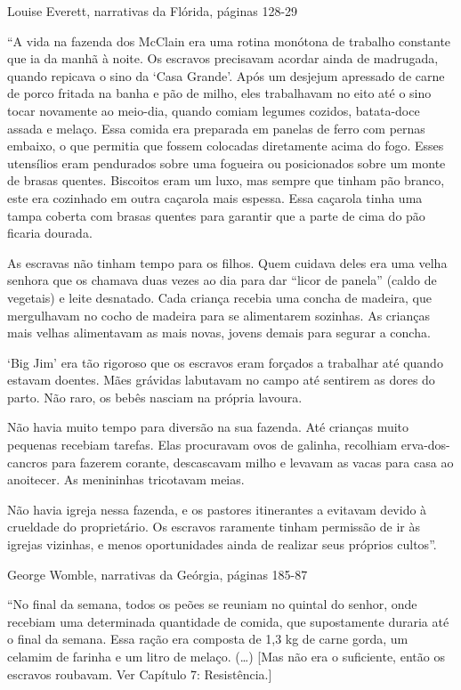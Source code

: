Louise Everett, narrativas da Flórida, páginas 128-29

``A vida na fazenda dos McClain era uma rotina monótona de trabalho
constante que ia da manhã à noite. Os escravos precisavam acordar ainda
de madrugada, quando repicava o sino da `Casa Grande'. Após um desjejum
apressado de carne de porco fritada na banha e pão de milho, eles
trabalhavam no eito até o sino tocar novamente ao meio-dia, quando
comiam legumes cozidos, batata-doce assada e melaço. Essa comida era
preparada em panelas de ferro com pernas embaixo, o que permitia que
fossem colocadas diretamente acima do fogo. Esses utensílios eram
pendurados sobre uma fogueira ou posicionados sobre um monte de brasas
quentes. Biscoitos eram um luxo, mas sempre que tinham pão branco, este
era cozinhado em outra caçarola mais espessa. Essa caçarola tinha uma
tampa coberta com brasas quentes para garantir que a parte de cima do
pão ficaria dourada.

As escravas não tinham tempo para os filhos. Quem cuidava deles era uma
velha senhora que os chamava duas vezes ao dia para dar ``licor de
panela'' (caldo de vegetais) e leite desnatado. Cada criança recebia uma
concha de madeira, que mergulhavam no cocho de madeira para se
alimentarem sozinhas. As crianças mais velhas alimentavam as mais novas,
jovens demais para segurar a concha.

`Big Jim' era tão rigoroso que os escravos eram forçados a trabalhar até
quando estavam doentes. Mães grávidas labutavam no campo até sentirem as
dores do parto. Não raro, os bebês nasciam na própria lavoura.

Não havia muito tempo para diversão na sua fazenda. Até crianças muito
pequenas recebiam tarefas. Elas procuravam ovos de galinha, recolhiam
erva-dos-cancros para fazerem corante, descascavam milho e levavam as
vacas para casa ao anoitecer. As menininhas tricotavam meias.

Não havia igreja nessa fazenda, e os pastores itinerantes a evitavam
devido à crueldade do proprietário. Os escravos raramente tinham
permissão de ir às igrejas vizinhas, e menos oportunidades ainda de
realizar seus próprios cultos''.

George Womble, narrativas da Geórgia, páginas 185-87

``No final da semana, todos os peões se reuniam no quintal do senhor,
onde recebiam uma determinada quantidade de comida, que supostamente
duraria até o final da semana. Essa ração era composta de 1,3 kg de
carne gorda, um celamim de farinha e um litro de melaço. (\ldots{})
{[}Mas não era o suficiente, então os escravos roubavam. Ver Capítulo 7:
Resistência.{]}

